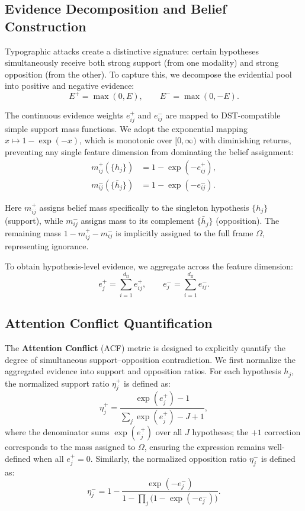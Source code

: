 \documentclass[preprint,12pt]{elsarticle}
\begin{document}
\subsection{Evidence Decomposition and Belief Construction}

Typographic attacks create a distinctive signature: certain hypotheses simultaneously receive both strong support (from one modality) and strong opposition (from the other). To capture this, we decompose the evidential pool into positive and negative evidence:
\begin{equation}
E^+ = \max(0, E), \qquad E^- = \max(0, -E).
\end{equation}

The continuous evidence weights $e^+_{ij}$ and $e^-_{ij}$ are mapped to DST-compatible simple support mass functions. We adopt the exponential mapping $x \mapsto 1 - \exp(-x)$, which is monotonic over $[0, \infty)$ with diminishing returns, preventing any single feature dimension from dominating the belief assignment:
\begin{align}
m^+_{ij}(\{h_j\}) &= 1 - \exp(-e^+_{ij}), \label{eq:mass_pos} \\[4pt]
m^-_{ij}(\{\bar{h}_j\}) &= 1 - \exp(-e^-_{ij}). \label{eq:mass_neg}
\end{align}

Here $m^+_{ij}$ assigns belief mass specifically to the singleton hypothesis $\{h_j\}$ (support), while $m^-_{ij}$ assigns mass to its complement $\{\bar{h}_j\}$ (opposition). The remaining mass $1 - m^+_{ij} - m^-_{ij}$ is implicitly assigned to the full frame $\Omega$, representing ignorance.

To obtain hypothesis-level evidence, we aggregate across the feature dimension:
\begin{equation}
e^+_j = \sum_{i=1}^{d_{\text{ff}}} e^+_{ij}, \qquad e^-_j = \sum_{i=1}^{d_{\text{ff}}} e^-_{ij}.
\label{eq:macro_evidence}
\end{equation}

\subsection{Attention Conflict Quantification}
\label{sec:acf_method}

The \textbf{Attention Conflict} (ACF) metric is designed to explicitly quantify the degree of simultaneous support--opposition contradiction. We first normalize the aggregated evidence into support and opposition ratios. For each hypothesis $h_j$, the normalized support ratio $\eta^+_j$ is defined as:
\begin{equation}
\eta^+_j = \frac{\exp(e^+_j) - 1}{\sum_{j} \exp(e^+_j) - J + 1},
\label{eq:eta_plus}
\end{equation}
where the denominator sums $\exp(e^+_j)$ over all $J$ hypotheses; the $+1$ correction corresponds to the mass assigned to $\Omega$, ensuring the expression remains well-defined when all $e^+_j = 0$. Similarly, the normalized opposition ratio $\eta^-_j$ is defined as:
\begin{equation}
\eta^-_j = 1 - \frac{\exp(-e^-_j)}{1 - \prod_{j} \bigl(1 - \exp(-e^-_j)\bigr)}.
\label{eq:eta_minus}
\end{equation}
\end{document}
